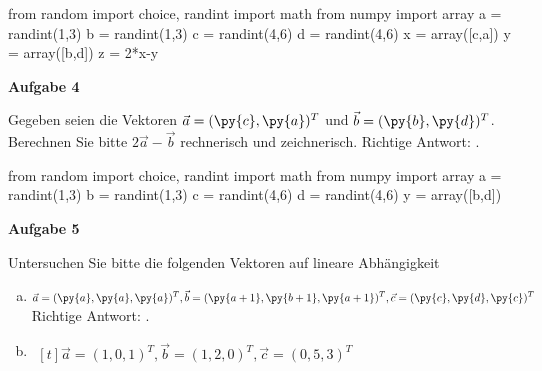 \documentclass[a4paper,12pt]{article}
\newcommand{\Aufgabe}[1]{
	{
		\vspace*{0.5cm}
		\textsf{\textbf{Aufgabe #1}}
		\vspace*{0.2cm}
		
	}
}
\begin{document}

\begin{pycode}
from random import choice, randint
import math
from numpy import array
a = randint(1,3)
b = randint(1,3)
c = randint(4,6)
d = randint(4,6)
x = array([c,a])
y = array([b,d])
z = 2*x-y
\end{pycode}

\Aufgabe{4}
Gegeben seien die Vektoren $\vec{a} = (\py{c},\py{a})^T$ und $\vec{b} = (\py{b},\py{d})^T$. Berechnen Sie bitte $2\vec{a}-\vec{b}$ rechnerisch und zeichnerisch.
\newline
\ifnum{} 
Richtige Antwort: .
\fi 
\newline

\begin{pycode}
from random import choice, randint
import math
from numpy import array
a = randint(1,3)
b = randint(1,3)
c = randint(4,6)
d = randint(4,6)
y = array([b,d])
\end{pycode}

\Aufgabe{5}
Untersuchen Sie bitte die folgenden Vektoren auf lineare Abhängigkeit
\begin{enumerate}[(a)]
	\item $\begin{aligned}[t]
	\vec{a} = (\py{a},\py{a},\py{a})^T,\vec{b} = (\py{a+1},\py{b+1},\py{a+1})^T,\vec{c} = (\py{c},\py{d},\py{c})^T
	\end{aligned}$
	\newline
	\ifnum{} 
	Richtige Antwort: .
	\fi 
	\newline
	\item $\begin{aligned}[t]
	\vec{a} = (1,0,1)^T,\vec{b} = (1,2,0)^T,\vec{c} = (0,5,3)^T
	\end{aligned}$
\end{enumerate}
\end{document}
